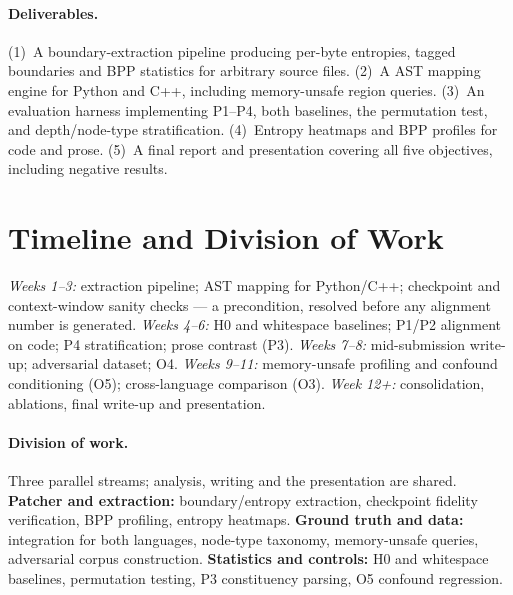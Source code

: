 \paragraph{Deliverables.} (1)~A boundary-extraction pipeline producing per-byte entropies,
tagged boundaries and BPP statistics for arbitrary source files. (2)~A  AST
mapping engine for Python and C++, including memory-unsafe region queries. (3)~An evaluation
harness implementing P1--P4, both baselines, the permutation test, and depth/node-type
stratification. (4)~Entropy heatmaps and BPP profiles for code and prose. (5)~A final report and
presentation covering all five objectives, including negative results.

\section{Timeline and Division of Work}

\noindent
\emph{Weeks 1--3:} extraction pipeline;  AST mapping for Python/C++;
checkpoint and context-window sanity checks --- a precondition, resolved before any alignment
number is generated. \emph{Weeks 4--6:} H0 and whitespace baselines; P1/P2 alignment on code;
P4 stratification; prose contrast (P3). \emph{Weeks 7--8:} mid-submission write-up;
adversarial dataset; O4. \emph{Weeks 9--11:} memory-unsafe profiling and confound conditioning
(O5); cross-language comparison (O3). \emph{Week 12+:} consolidation, ablations, final
write-up and presentation.

\paragraph{Division of work.} Three parallel streams; analysis, writing and the presentation
are shared. \textbf{Patcher and extraction:} boundary/entropy extraction, checkpoint
fidelity verification, BPP profiling, entropy heatmaps. \textbf{Ground truth and data:}
 integration for both languages, node-type taxonomy, memory-unsafe queries,
adversarial corpus construction. \textbf{Statistics and controls:} H0 and whitespace
baselines, permutation testing, P3 constituency parsing, O5 confound regression.

